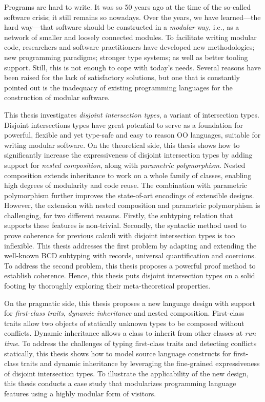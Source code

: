 %
\noindent
%
Programs are hard to write. It was so 50 years ago at the time of the so-called
software crisis; it still remains so nowadays. Over the years, we have
learned---the hard way---that software should be constructed in a
\emph{modular} way, i.e., as a network of smaller and loosely connected
modules. To facilitate writing modular code, researchers and software
practitioners have developed new methodologies; new programming paradigms;
stronger type systems; as well as better tooling support. Still, this is not
enough to cope with today's needs. Several reasons have been raised for the lack
of satisfactory solutions, but one that is constantly pointed out is the
inadequacy of existing programming languages for the construction of
modular software.

This thesis investigates \emph{disjoint intersection types}, a variant of
intersection types. Disjoint intersections types have great potential to serve
as a foundation for powerful, flexible and yet type-safe and easy to reason OO
languages, suitable for writing modular software. On the theoretical side, this
thesis shows how to significantly increase the expressiveness of disjoint
intersection types by adding support for \emph{nested composition}, along with
\emph{parametric polymorphism}. Nested composition extends inheritance to work
on a whole family of classes, enabling high degrees of modularity and code
reuse. The combination with parametric polymorphism further improves the
state-of-art encodings of extensible designs. However, the extension with nested
composition and parametric polymorphism is challenging, for two different
reasons. Firstly, the subtyping relation that supports these features is
non-trivial. Secondly, the syntactic method used to prove coherence for previous
calculi with disjoint intersection types is too inflexible. This thesis
addresses the first problem by adapting and extending the well-known BCD
subtyping with records, universal quantification and coercions. To address the
second problem, this thesis proposes a powerful proof method to establish
coherence. Hence, this thesis puts disjoint intersection types on a solid
footing by thoroughly exploring their meta-theoretical properties.

On the pragmatic side, this thesis proposes a new language design with support
for \emph{first-class traits}, \emph{dynamic inheritance} and nested
composition. First-class traits allow two objects of statically unknown types
to be composed without conflicts. Dynamic inheritance allows a class to inherit
from other classes at \emph{run time}. To address the challenges of typing
first-class traits and detecting conflicts statically, this thesis shows how to
model source language constructs for first-class traits and dynamic inheritance
by leveraging the fine-grained expressiveness of disjoint intersection types. To
illustrate the applicability of the new design, this thesis conducts a case
study that modularizes programming language features using a highly modular form
of visitors.

